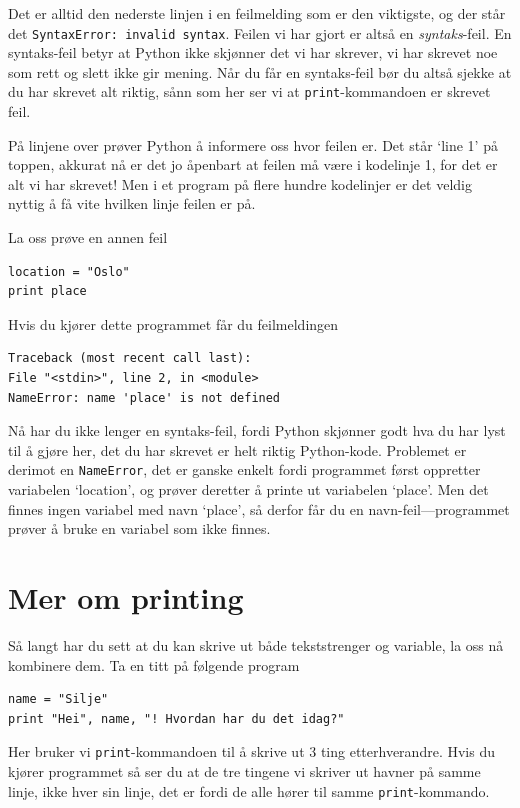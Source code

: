 \documentclass[a4paper, 11pt, notitlepage]{article}
\begin{document}
Det er alltid den nederste linjen i en feilmelding som er den viktigste, og der står det \verb+SyntaxError: invalid syntax+. Feilen vi har gjort er altså en \emph{syntaks}-feil. En syntaks-feil betyr at Python ikke skjønner det vi har skrever, vi har skrevet noe som rett og slett ikke gir mening. Når du får en syntaks-feil bør du altså sjekke at du har skrevet alt riktig, sånn som her ser vi at \verb+print+-kommandoen er skrevet feil. 

På linjene over prøver Python å informere oss hvor feilen er. Det står `line 1' på toppen, akkurat nå er det jo åpenbart at feilen må være i kodelinje 1, for det er alt vi har skrevet! Men i et program på flere hundre kodelinjer er det veldig nyttig å få vite hvilken linje feilen er på. 

La oss prøve en annen feil
\begin{lstlisting}
location = "Oslo"
print place
\end{lstlisting}
Hvis du kjører dette programmet får du feilmeldingen
\begin{verbatim}
Traceback (most recent call last):
File "<stdin>", line 2, in <module>
NameError: name 'place' is not defined
\end{verbatim}
Nå har du ikke lenger en syntaks-feil, fordi Python skjønner godt hva du har lyst til å gjøre her, det du har skrevet er helt riktig Python-kode. Problemet er derimot en \verb+NameError+, det er ganske enkelt fordi programmet først oppretter variabelen `location', og prøver deretter å printe ut variabelen `place'. Men det finnes ingen variabel med navn `place', så derfor får du en navn-feil---programmet prøver å bruke en variabel som ikke finnes.

\section*{Mer om printing}

Så langt har du sett at du kan skrive ut både tekststrenger og variable, la oss nå kombinere dem. Ta en titt på følgende program
\begin{lstlisting}
name = "Silje"
print "Hei", name, "! Hvordan har du det idag?"
\end{lstlisting}
Her bruker vi \verb+print+-kommandoen til å skrive ut 3 ting etterhverandre. Hvis du kjører programmet så ser du at de tre tingene vi skriver ut havner på samme linje, ikke hver sin linje, det er fordi de alle hører til samme \verb+print+-kommando.
\end{document}
